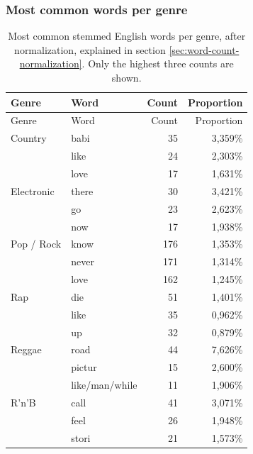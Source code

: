 \documentclass[                                                             %
        12pt,                                                                   %
        twoside                                                                 %
    ]{scrartcl}                                                                 %
\begin{document}
\subsubsection{Most common words per genre}

{\footnotesize
\begin{longtabu}{l l r r}
    \caption[Most common stemmed English words per genre, after normalization.]{%
        Most common stemmed English words per genre, after normalization,
        explained in section \ref{sec:word-count-normalization}.
        Only the highest three counts are shown.
    }
    \label{tab:most-common-words-by-genre} \\ \toprule
    Genre & Word & Count & Proportion \\ \midrule
    \endfirsthead
    \toprule
    Genre & Word & Count & Proportion \\ \midrule
    \endhead
    \bottomrule
    \endfoot
	Country    & babi                       & 35  & 3,359\% \\*
	           & like                       & 24  & 2,303\% \\*
	           & love                       & 17  & 1,631\% \\
	Electronic & there                      & 30  & 3,421\% \\*
	           & go                         & 23  & 2,623\% \\*
	           & now                        & 17  & 1,938\% \\
	Pop / Rock & know                       & 176 & 1,353\% \\*
	           & never                      & 171 & 1,314\% \\*
	           & love                       & 162 & 1,245\% \\
	Rap        & die                        & 51  & 1,401\% \\*
	           & like                       & 35  & 0,962\% \\*
	           & up                         & 32  & 0,879\% \\
	Reggae     & road                       & 44  & 7,626\% \\*
	           & pictur                     & 15  & 2,600\% \\*
	           & like\slash man\slash while & 11  & 1,906\% \\
	R'n'B      & call                       & 41  & 3,071\% \\*
	           & feel                       & 26  & 1,948\% \\*
	           & stori                      & 21  & 1,573\%
\end{longtabu}
}
\end{document}
